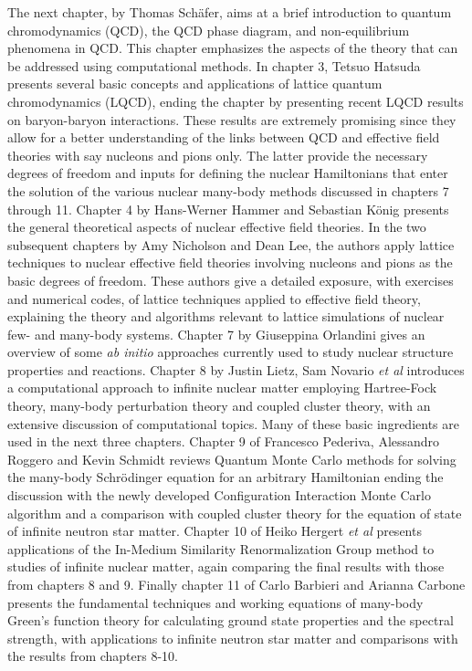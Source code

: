 The next chapter, by Thomas Sch\"afer, aims at a brief introduction to
quantum chromodynamics (QCD), the QCD phase diagram, and
non-equilibrium phenomena in QCD. This chapter emphasizes the aspects
of the theory that can be addressed using computational methods. In
chapter 3, Tetsuo Hatsuda presents several basic concepts and
applications of lattice quantum chromodynamics (LQCD), ending the
chapter by presenting recent LQCD results on baryon-baryon
interactions.  These results are extremely promising since they allow
for a better understanding of the links between QCD and effective
field theories with say nucleons and pions only. The latter provide
the necessary degrees of freedom and inputs for defining the nuclear
Hamiltonians that enter the solution of the various nuclear many-body
methods discussed in chapters 7 through 11. Chapter 4 by Hans-Werner
Hammer and Sebastian K\"onig presents the general theoretical aspects
of nuclear effective field theories. In the two subsequent chapters by
Amy Nicholson and Dean Lee, the authors apply lattice techniques to
nuclear effective field theories involving nucleons and pions as the
basic degrees of freedom. These authors give a detailed exposure, with
exercises and numerical codes, of lattice techniques applied to
effective field theory, explaining the theory and algorithms relevant
to lattice simulations of nuclear few- and many-body systems.  Chapter
7 by Giuseppina Orlandini gives an overview of some {\it ab initio}
approaches currently used to study nuclear structure properties and
reactions. Chapter 8 by Justin Lietz, Sam Novario {\em et al}
introduces a computational approach to infinite nuclear matter
employing Hartree-Fock theory, many-body perturbation theory and
coupled cluster theory, with an extensive discussion of computational
topics. Many of these basic ingredients are used in the next three
chapters. Chapter 9 of Francesco Pederiva, Alessandro Roggero and
Kevin Schmidt reviews Quantum Monte Carlo methods for solving the
many-body Schr\"odinger equation for an arbitrary Hamiltonian ending
the discussion with the newly developed Configuration Interaction
Monte Carlo algorithm and a comparison with coupled cluster theory for
the equation of state of infinite neutron star matter. Chapter 10 of
Heiko Hergert {\em et al} presents applications of the In-Medium
Similarity Renormalization Group method to studies of infinite nuclear
matter, again comparing the final results with those from chapters 8 and 9.
Finally chapter 11 of Carlo Barbieri and Arianna Carbone presents the
fundamental techniques and working equations of many-body Green's
function theory for calculating ground state properties and the
spectral strength, with applications to infinite neutron star matter and comparisons with the results from
chapters 8-10. 



